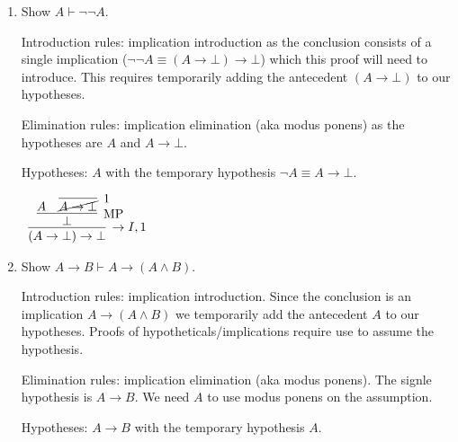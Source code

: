 \documentclass[11pt]{report}
\begin{document}
\begin{enumerate}
	\item Show $A \vdash \lnot \lnot A$.
	
	\hspace{0.2cm}{\bf Solution}

	Introduction rules: implication introduction as the conclusion consists of a single implication ($\lnot \lnot A \equiv (A \to \bot) \to \bot$) which this proof will need to introduce. This requires temporarily adding the antecedent $(A \to \bot)$ to our hypotheses. 

	Elimination rules: implication elimination (aka modus ponens) as the hypotheses are $A$ and $A \to \bot$. 

	\vspace{0.3cm}
	
	Hypotheses: $A$ with the temporary hypothesis $\lnot A \equiv A \to \bot$.

	\begin{mdframed}
		\begin{center}
			$\begin{array}{c}
				\infer[\to I,1]{(A \to \bot) \to \bot}
					{\infer[\MP]{\bot}
						{A
						&
						\infer[1]{\cancel{A \to \bot}}{}}}			
			\end{array}$
		\end{center}
	\end{mdframed}
	
	
	\item Show $A \to B \vdash A \to (A \land B)$.
	
	\hspace{0.2cm}{\bf Solution}

	Introduction rules: implication introduction. Since the conclusion is an implication $A \to (A \land B)$ we temporarily add the antecedent $A$ to our hypotheses. Proofs of hypotheticals/implications require use to assume the hypothesis. 

	Elimination rules: implication elimination (aka modus ponens). The signle hypothesis is $A \to B$. We need $A$ to use modus ponens on the assumption. 

	\vspace{0.3cm}
	
	Hypotheses: $A \to B$ with the temporary hypothesis $A$.


\end{enumerate}
\end{document}
